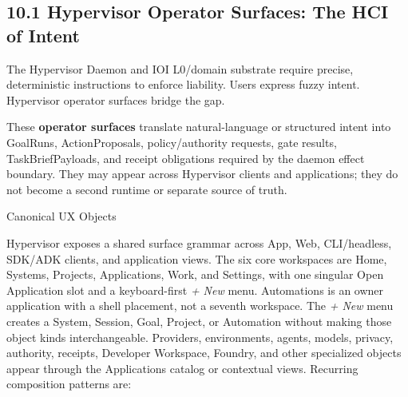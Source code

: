 \documentclass[
  11pt,
]{article}
\begin{document}
\hypertarget{the-control-plane-the-hci-of-intent}{%
\subsection{10.1 Hypervisor Operator Surfaces: The HCI of
Intent}\label{the-control-plane-the-hci-of-intent}}

The Hypervisor Daemon and IOI L0/domain substrate require precise,
deterministic instructions to enforce liability. Users express fuzzy
intent. Hypervisor operator surfaces bridge the gap.

These \textbf{operator surfaces} translate natural-language or structured
intent into GoalRuns, ActionProposals, policy/authority requests, gate
results, TaskBriefPayloads, and receipt obligations required by the daemon
effect boundary. They may appear across Hypervisor clients and applications;
they do not become a second runtime or separate source of truth.

Canonical UX Objects

Hypervisor exposes a shared surface grammar across App, Web,
CLI/headless, SDK/ADK clients, and application views. The six core workspaces
are Home, Systems, Projects, Applications, Work, and Settings, with one
singular Open Application slot and a keyboard-first \emph{+ New} menu.
Automations is an owner application with a shell placement, not a seventh
workspace. The \emph{+ New} menu creates a System, Session, Goal,
Project, or Automation without making those object kinds interchangeable.
Providers, environments, agents, models, privacy, authority, receipts,
Developer Workspace, Foundry, and other specialized objects appear through
the Applications catalog or contextual views. Recurring
composition patterns are:
\end{document}
